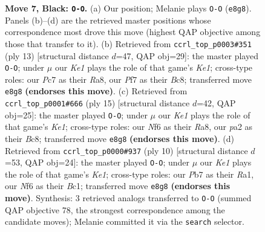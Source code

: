 \documentclass[11pt]{article}
\begin{document}
\begin{figure}[p]
\caption{\textbf{Move 7, Black: \texttt{O-O}.} (a) Our position; Melanie plays \texttt{O-O} (\texttt{e8g8}). Panels (b)--(d) are the retrieved master positions whose correspondence most drove this move (highest QAP objective among those that transfer to it). (b) Retrieved from \texttt{ccrl\_top\_p0003\#351} (ply 13) [structural distance $d$=47, QAP obj=29]: the master played \texttt{O-O}; under $\mu$ our \emph{Ke1} plays the role of that game's \emph{Ke1}; cross-type roles: our \emph{P}c7 as their \emph{R}a8, our \emph{P}f7 as their \emph{B}c8; transferred move \texttt{e8g8} \textbf{(endorses this move)}. (c) Retrieved from \texttt{ccrl\_top\_p0001\#666} (ply 15) [structural distance $d$=42, QAP obj=25]: the master played \texttt{O-O}; under $\mu$ our \emph{Ke1} plays the role of that game's \emph{Ke1}; cross-type roles: our \emph{N}f6 as their \emph{R}a8, our \emph{p}a2 as their \emph{B}c8; transferred move \texttt{e8g8} \textbf{(endorses this move)}. (d) Retrieved from \texttt{ccrl\_top\_p0000\#937} (ply 10) [structural distance $d$=53, QAP obj=24]: the master played \texttt{O-O}; under $\mu$ our \emph{Ke1} plays the role of that game's \emph{Ke1}; cross-type roles: our \emph{P}b7 as their \emph{R}a1, our \emph{N}f6 as their \emph{B}c1; transferred move \texttt{e8g8} \textbf{(endorses this move)}. Synthesis: 3 retrieved analogs transferred to \texttt{O-O} (summed QAP objective 78, the strongest correspondence among the candidate moves); Melanie committed it via the \texttt{search} selector.}
\label{fig:thought-m13}
\end{figure}

\clearpage
\end{document}
